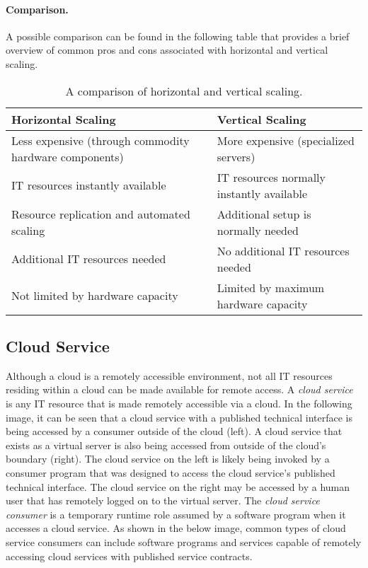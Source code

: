 \paragraph*{Comparison.} A possible comparison can be found in the following table that provides a brief overview of common pros and cons associated with horizontal and vertical scaling.
\begin{table}[H]
	\centering
	\begin{tabular}{| p{7.5cm} | p{7.5cm} |}
		\hline
		\textbf{Horizontal Scaling} & \textbf{Vertical Scaling} \\ 
		\hline
		Less expensive (through commodity hardware components) & More expensive
		(specialized servers) \\
		\hline
		IT resources instantly available & IT resources normally instantly available \\
		\hline
		Resource replication and automated scaling & Additional setup is normally needed \\
		\hline
		Additional IT resources needed & No additional IT resources needed \\
		\hline
		Not limited by hardware capacity & Limited by maximum hardware capacity \\
		\hline
	\end{tabular}
	\caption{A comparison of horizontal and vertical scaling.}
\end{table}

\subsection{Cloud Service}
Although a cloud is a remotely accessible environment, not all IT resources residing within a cloud can be made available for remote access. A \textit{cloud service} is any IT resource that is made remotely accessible via a cloud. In the following image, it can be seen that a cloud service with a published technical interface is being accessed by a consumer outside of the cloud (left). A cloud service that exists as a virtual server is also being accessed from outside of the cloud’s boundary (right). The cloud service on the left is likely being invoked by a consumer program that was designed to access the cloud service’s published technical interface. The cloud service on the right may be accessed by a human user that has remotely logged on to the virtual server.
The \textit{cloud service consumer} is a temporary runtime role assumed by a software program when it accesses a cloud service. As shown in the below image,  common types of cloud service consumers can include software programs and services capable of remotely accessing cloud services with published service contracts.

